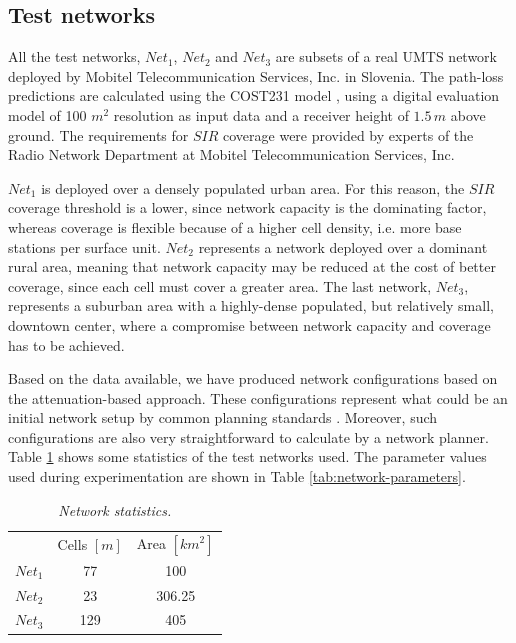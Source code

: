 \subsection{Test networks}

All the test networks, $Net_{1}$, $Net_{2}$ and $Net_{3}$ are subsets
of a real UMTS network deployed by Mobitel Telecommunication Services,
Inc. in Slovenia. The path-loss predictions are calculated using the
COST231 model \cite{Cichon_Propagation.prediction.models:1995}, using
a digital evaluation model of 100 $m^{2}$ resolution as input data
and a receiver height of $1.5\, m$ above ground. The requirements
for $SIR$ coverage were provided by experts of the Radio Network
Department at Mobitel Telecommunication Services, Inc.

$Net_{1}$ is deployed over a densely populated urban area. For this
reason, the $SIR$ coverage threshold is a lower, since network capacity
is the dominating factor, whereas coverage is flexible because of
a higher cell density, i.e. more base stations per surface unit. $Net_{2}$
represents a network deployed over a dominant rural area, meaning
that network capacity may be reduced at the cost of better coverage,
since each cell must cover a greater area. The last network, $Net_{3}$,
represents a suburban area with a highly-dense populated, but relatively
small, downtown center, where a compromise between network capacity
and coverage has to be achieved.

Based on the data available, we have produced network configurations
based on the attenuation-based approach. These configurations represent
what could be an initial network setup by common planning standards
\cite{Holma_WCDMA.for.UMTS:2005}. Moreover, such configurations are
also very straightforward to calculate by a network planner. Table
\ref{tab:network-statistics} shows some statistics of the test networks
used. The parameter values used during experimentation are shown in
Table \ref{tab:network-parameters}.

\begin{table}
\caption{\textit{Network statistics.\label{tab:network-statistics}}}


\centering

\begin{tabular}{ccc}
\toprule 
 & Cells $[m]$ & Area $[km^{2}]$\tabularnewline\addlinespace
\midrule
$Net_{1}$ & 77 & 100\tabularnewline
$Net_{2}$ & 23 & 306.25\tabularnewline
$Net_{3}$ & 129 & 405\tabularnewline
\bottomrule
\end{tabular}
\end{table}


